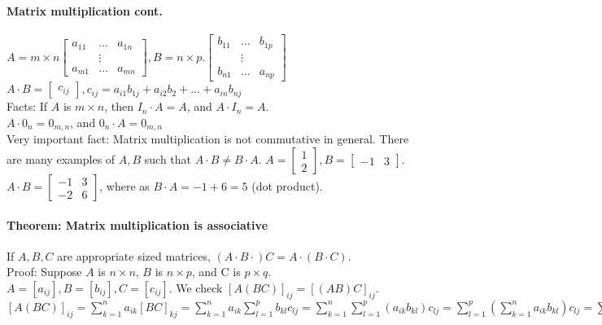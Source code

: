 \documentclass[10pt,letter]{article}
\begin{document}
\section*{}

\paragraph{Matrix multiplication cont.}
$A=m\times n
\begin{bmatrix}
a_{11} & \ldots & a_{1n} \\
 & \vdots \\
a_{m1} & \ldots & a_{mn}
\end{bmatrix}, B=n\times p. 
\begin{bmatrix}
b_{11} & \ldots & b_{1p} \\
 & \vdots \\
b_{n1} & \ldots & a_{np}
\end{bmatrix}$ 
$A\cdot B = 
\begin{bmatrix}c_{ij}
\end{bmatrix}, c_{ij}=a_{i1}b_{1j}+a_{i2}b_{2}+\ldots+a_{in}b_{nj}$ \\ 
Facts: If $A$ is $m\times n$, then $I_n\cdot A = A$, and $A\cdot I_n=A$. \\
$A\cdot 0_n=0_{m,n}$, and $0_n\cdot A = 0_{m,n}$ \\ 
Very important fact: Matrix multiplication is not commutative in general. There are many examples of $A,B$ such that $A\cdot B\neq B\cdot A$. $A=\begin{bmatrix}
1\\2
\end{bmatrix}, B = \begin{bmatrix}-1&3\end{bmatrix}$. $A\cdot B = \begin{bmatrix}-1 & 3 \\ -2 & 6\end{bmatrix}$, where as $B\cdot A = -1 + 6 = 5$ (dot product). 

\paragraph{Theorem: Matrix multiplication is associative}
If $A,B,C$ are appropriate sized matrices, $(A\cdot B\cdot) C=A\cdot(B\cdot C)$.\\ 
Proof: Suppose $A$ is $n\times n$, $B$ is $n\times p$, and C is $p\times q$. $A=[a_{ij}],B=[b_{ij}],C=[c_{ij}]$. We check $[A(BC)]_{ij}=[(AB)C]_{ij}$. $[A(BC)]_{ij}=\sum_{k=1}^na_{ik}[BC]_{kj}=\sum_{k=1}^na_{ik}\sum_{l=1}^pb_{kl}c_{lj} = \sum_{k=1}^n\sum_{l=1}^p(a_{ik}b_{kl})c_{lj}=\sum_{l=1}^p(\sum_{k=1}^na_{ik}b_{kl})c_{lj}=\sum_{l=1}^p[AB]_{il}c_{lj}=[(AB)C]_{ij}$
\end{document}
